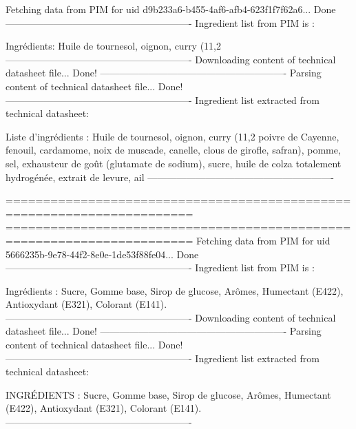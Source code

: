                 \begin{spacing}{1.0}
                \label{blocks_examples}
                {\scriptsize
                {\ttfamily 
                \begin{spverbatim}
Fetching data from PIM for uid d9b233a6-b455-4af6-afb4-623f1f7f62a6...
Done
----------------------------------------------------------
Ingredient list from PIM is :

Ingrédients: Huile de tournesol, oignon, curry (11,2%
----------------------------------------------------------
Downloading content of technical datasheet file...
Done!
----------------------------------------------------------
Parsing content of technical datasheet file...
Done!
----------------------------------------------------------
Ingredient list extracted from technical datasheet:

Liste d’ingrédients : Huile de tournesol, oignon, curry (11,2%
poivre de Cayenne, fenouil, cardamome, noix de muscade, canelle, clous de girofle, safran), pomme, sel, exhausteur de goût
(glutamate de sodium), sucre, huile de colza totalement hydrogénée, extrait de levure, ail
----------------------------------------------------------

=======================================================================
=======================================================================
Fetching data from PIM for uid 5666235b-9e78-44f2-8e0e-1de53f88fe04...
Done
----------------------------------------------------------
Ingredient list from PIM is :

Ingrédients : Sucre, Gomme base, Sirop de glucose, Arômes, Humectant (E422), Antioxydant (E321), Colorant (E141).
----------------------------------------------------------
Downloading content of technical datasheet file...
Done!
----------------------------------------------------------
Parsing content of technical datasheet file...
Done!
----------------------------------------------------------
Ingredient list extracted from technical datasheet:

INGRÉDIENTS : Sucre, Gomme base, Sirop de glucose, Arômes, Humectant (E422), 
Antioxydant (E321), Colorant (E141).
----------------------------------------------------------


\end{spverbatim}}}
\end{spacing}
